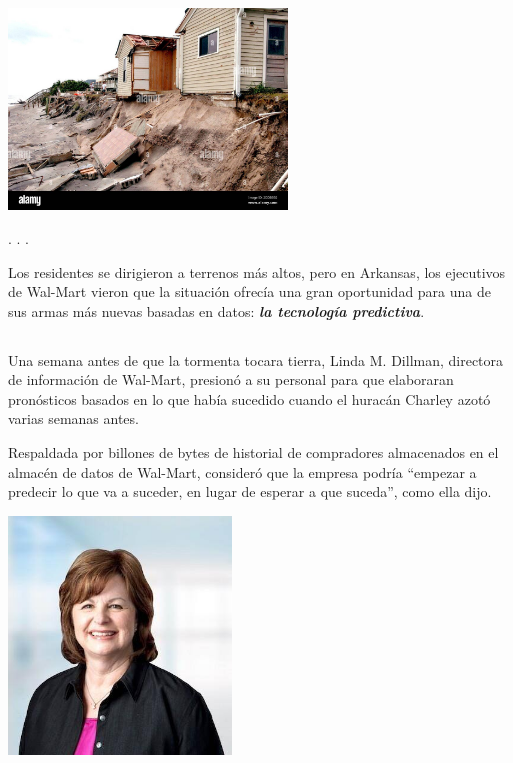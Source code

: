 \documentclass[
  letterpaper,
  DIV=11,
  numbers=noendperiod]{scrartcl}
\begin{document}
\includegraphics[width=2.91667in,height=\textheight]{images/clipboard-679480994.png}

. . .

Los residentes se dirigieron a terrenos más altos, pero en Arkansas, los
ejecutivos de Wal-Mart vieron que la situación ofrecía una gran
oportunidad para una de sus armas más nuevas basadas en datos:
\textbf{\emph{la tecnología predictiva}}.

\hypertarget{section}{%
\subsection{}\label{section}}

Una semana antes de que la tormenta tocara tierra, Linda M. Dillman,
directora de información de Wal-Mart, presionó a su personal para que
elaboraran pronósticos basados en lo que había sucedido cuando el
huracán Charley azotó varias semanas antes.

Respaldada por billones de bytes de historial de compradores almacenados
en el almacén de datos de Wal-Mart, consideró que la empresa podría
``empezar a predecir lo que va a suceder, en lugar de esperar a que
suceda'', como ella dijo.

\includegraphics[width=2.33333in,height=\textheight]{images/clipboard-3960378011.png}
\end{document}
